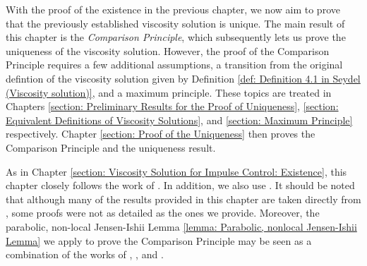 \label{section: Viscosity Solution for Impulse Control: Uniqueness}
With the proof of the existence in the previous chapter, we now aim to prove that the previously established viscosity solution is unique. The main result of this chapter is the \textit{Comparison Principle}, which subsequently lets us prove the uniqueness of the viscosity solution. However, the proof of the Comparison Principle requires a few additional assumptions, a transition from the original defintion of the viscosity solution given by Definition \ref{def: Definition 4.1 in Seydel (Viscosity solution)}, and a maximum principle. These topics are treated in Chapters \ref{section: Preliminary Results for the Proof of Uniqueness}, \ref{section: Equivalent Definitions of Viscosity Solutions}, and \ref{section: Maximum Principle} respectively. Chapter \ref{section: Proof of the Uniqueness} then proves the Comparison Principle and the uniqueness result. 

As in Chapter \ref{section: Viscosity Solution for Impulse Control: Existence}, this chapter closely follows the work of \textcite[Section 5]{seydel2010generalexistenceuniquenessviscosity}. In addition, we also use \cite{barles2008second}. It should be noted that although many of the results provided in this chapter are taken directly from \cite{seydel2010generalexistenceuniquenessviscosity}, some proofs were not as detailed as the ones we provide. Moreover, the parabolic, non-local Jensen-Ishii Lemma \ref{lemma: Parabolic, nonlocal Jensen-Ishii Lemma} we apply to prove the Comparison Principle may be seen as a combination of the works of \textcite[Lemma 1]{barles2008second}, \textcite{jakobsen2006maximum}, and \textcite[Theorem 8.3]{crandall1992user}.

